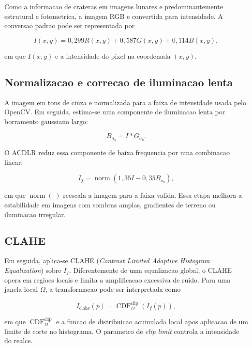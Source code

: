 \documentclass[12pt,a4paper]{article}
\begin{document}
Como a informacao de crateras em imagens lunares e predominantemente estrutural e fotometrica, a imagem RGB e convertida para intensidade. A conversao padrao pode ser representada por

\begin{equation}
I(x,y) = 0{,}299R(x,y) + 0{,}587G(x,y) + 0{,}114B(x,y),
\end{equation}

em que $I(x,y)$ e a intensidade do pixel na coordenada $(x,y)$.

\subsection{Normalizacao e correcao de iluminacao lenta}

A imagem em tons de cinza e normalizada para a faixa de intensidade usada pelo OpenCV. Em seguida, estima-se uma componente de iluminacao lenta por borramento gaussiano largo:

\begin{equation}
B_{\sigma_b} = I * G_{\sigma_b}.
\end{equation}

O ACDLR reduz essa componente de baixa frequencia por uma combinacao linear:

\begin{equation}
I_f = \operatorname{norm}(1{,}35I - 0{,}35B_{\sigma_b}),
\end{equation}

em que $\operatorname{norm}(\cdot)$ reescala a imagem para a faixa valida. Essa etapa melhora a estabilidade em imagens com sombras amplas, gradientes de terreno ou iluminacao irregular.

\subsection{CLAHE}

Em seguida, aplica-se CLAHE (\textit{Contrast Limited Adaptive Histogram Equalization}) sobre $I_f$. Diferentemente de uma equalizacao global, o CLAHE opera em regioes locais e limita a amplificacao excessiva de ruido. Para uma janela local $\Omega$, a transformacao pode ser interpretada como

\begin{equation}
I_{\text{clahe}}(p) = \operatorname{CDF}_{\Omega}^{\text{clip}}(I_f(p)),
\end{equation}

em que $\operatorname{CDF}_{\Omega}^{\text{clip}}$ e a funcao de distribuicao acumulada local apos aplicacao de um limite de corte no histograma. O parametro de \textit{clip limit} controla a intensidade do realce.
\end{document}
